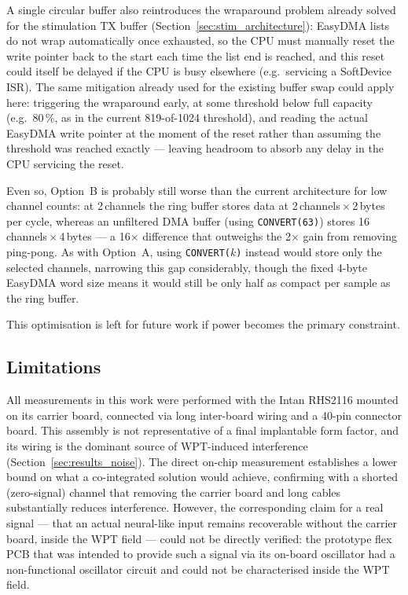 A single circular buffer also reintroduces the wraparound problem already solved
for the stimulation TX buffer (Section~\ref{sec:stim_architecture}): EasyDMA lists
do not wrap automatically once exhausted, so the CPU must manually reset the write
pointer back to the start each time the list end is reached, and this reset could
itself be delayed if the CPU is busy elsewhere (e.g.\ servicing a SoftDevice ISR).
The same mitigation already used for the existing buffer swap could apply here:
triggering the wraparound early, at some threshold below full capacity (e.g.\
80\,\%, as in the current 819-of-1024 threshold), and reading the actual EasyDMA
write pointer at the moment of the reset rather than assuming the threshold was
reached exactly --- leaving headroom to absorb any delay in the CPU servicing the
reset.

Even so, Option~B is probably still worse than the current
architecture for low channel counts: at 2\,channels the ring buffer stores data
at 2\,channels\,$\times$\,2\,bytes per cycle, whereas an unfiltered DMA buffer
(using \texttt{CONVERT(63)}) stores 16\,channels\,$\times$\,4\,bytes --- a
16$\times$ difference that outweighs the 2$\times$ gain from removing ping-pong.
As with Option~A, using \texttt{CONVERT($k$)} instead would store only the
selected channels, narrowing this gap considerably, though the fixed 4-byte
EasyDMA word size means it would still be only half as compact per sample as the
ring buffer.

This optimisation is left for future work if power becomes the primary
constraint.

\subsection{Limitations}

All measurements in this work were performed with the Intan RHS2116 mounted on its
carrier board, connected via long inter-board wiring and a 40-pin connector board.
This assembly is not representative of a final implantable form factor, and its
wiring is the dominant source of WPT-induced interference (Section~\ref{sec:results_noise}).
The direct on-chip measurement establishes a lower bound on what a co-integrated
solution would achieve, confirming with a shorted (zero-signal) channel that
removing the carrier board and long cables substantially reduces interference.
However, the corresponding claim for a real signal --- that an actual neural-like
input remains recoverable without the carrier board, inside the WPT field ---
could not be directly verified: the prototype flex PCB that was intended to
provide such a signal via its on-board oscillator had a non-functional oscillator
circuit and could not be characterised inside the WPT field.

